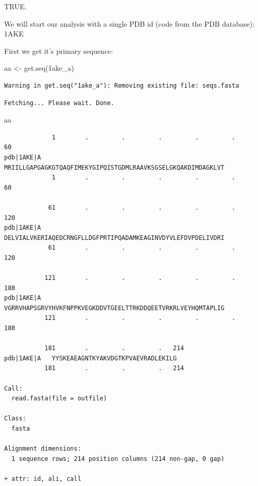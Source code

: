 \documentclass[
  letterpaper,
  DIV=11,
  numbers=noendperiod]{scrartcl}
\newenvironment{Shaded}{\begin{snugshade}}{\end{snugshade}}
\newcommand{\FunctionTok}[1]{\textcolor[rgb]{0.28,0.35,0.67}{#1}}
\newcommand{\NormalTok}[1]{\textcolor[rgb]{0.00,0.23,0.31}{#1}}
\newcommand{\OtherTok}[1]{\textcolor[rgb]{0.00,0.23,0.31}{#1}}
\newcommand{\StringTok}[1]{\textcolor[rgb]{0.13,0.47,0.30}{#1}}
\begin{document}
TRUE.

We will start our analysis with a single PDB id (code from the PDB
database): 1AKE

First we get it's primary sequence:

\begin{Shaded}
\begin{Highlighting}[]
\NormalTok{aa }\OtherTok{\textless{}{-}} \FunctionTok{get.seq}\NormalTok{(}\StringTok{\textquotesingle{}1ake\_a\textquotesingle{}}\NormalTok{)}
\end{Highlighting}
\end{Shaded}

\begin{verbatim}
Warning in get.seq("1ake_a"): Removing existing file: seqs.fasta
\end{verbatim}

\begin{verbatim}
Fetching... Please wait. Done.
\end{verbatim}

\begin{Shaded}
\begin{Highlighting}[]
\NormalTok{aa}
\end{Highlighting}
\end{Shaded}

\begin{verbatim}
             1        .         .         .         .         .         60 
pdb|1AKE|A   MRIILLGAPGAGKGTQAQFIMEKYGIPQISTGDMLRAAVKSGSELGKQAKDIMDAGKLVT
             1        .         .         .         .         .         60 

            61        .         .         .         .         .         120 
pdb|1AKE|A   DELVIALVKERIAQEDCRNGFLLDGFPRTIPQADAMKEAGINVDYVLEFDVPDELIVDRI
            61        .         .         .         .         .         120 

           121        .         .         .         .         .         180 
pdb|1AKE|A   VGRRVHAPSGRVYHVKFNPPKVEGKDDVTGEELTTRKDDQEETVRKRLVEYHQMTAPLIG
           121        .         .         .         .         .         180 

           181        .         .         .   214 
pdb|1AKE|A   YYSKEAEAGNTKYAKVDGTKPVAEVRADLEKILG
           181        .         .         .   214 

Call:
  read.fasta(file = outfile)

Class:
  fasta

Alignment dimensions:
  1 sequence rows; 214 position columns (214 non-gap, 0 gap) 

+ attr: id, ali, call
\end{verbatim}
\end{document}
